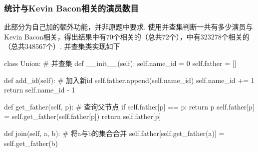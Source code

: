 \documentclass[12pt, a4paper, oneside]{ctexart}
\numberwithin{equation}{section}  %
\begin{document}
\subsubsection{统计与Kevin Bacon相关的演员数目}
此部分为自己加的额外功能，并非原题中要求. 使用并查集判断一共有多少演员与Kevin Bacon相关，得出结果中有$70$个相关的（总共$72$个），中有$323278$个相关的（总共$348567$个）. 并查集类实现如下
\begin{pythoncode}
class Union:  # 并查集
    def __init__(self):
        self.name_id = 0
        self.father = []

    def add_id(self):  # 加入新id
        self.father.append(self.name_id)
        self.name_id += 1
        return self.name_id - 1

    def get_father(self, p):  # 查询父节点
        if self.father[p] == p: return p
        self.father[p] = self.get_father(self.father[p])
        return self.father[p]
    
    def join(self, a, b):  # 将a与b的集合合并
        self.father[self.get_father(a)] = self.get_father(b)
\end{pythoncode}
\end{document}
